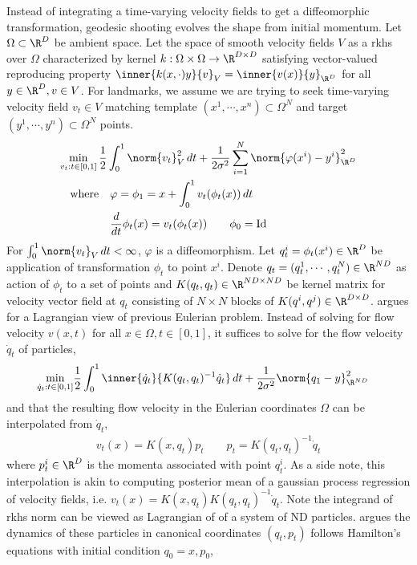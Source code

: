 \documentclass[11pt]{article}
\begin{document}
Instead of integrating a time-varying velocity fields to get a diffeomorphic transformation, geodesic shooting evolves the shape from initial momentum. Let $\Omega \subset\R^D$ be ambient space. Let the space of smooth velocity fields $V$ as a rkhs over $\Omega$ characterized by kernel $k:\Omega\times\Omega\to\R^{D\times D}$ satisfying vector-valued reproducing property $\inner{k(x,\cdot)y}{v}_{V} = \inner{v(x)}{y}_{\R^D}$ for all $y\in\R^D, v\in V$. For landmarks, we assume we are trying to seek time-varying velocity field $v_t\in V$ matching template $(x^1,\cdots,x^n)\subset \Omega^N$ and target $(y^1,\cdots,y^n)\subset\Omega^N$ points.
\begin{align}
    \min_{v_t:t\in [0,1]} \,
        &\frac{1}{2} \int_0^1 \norm{v_t}_V^2 \, dt + \frac{1}{2\sigma^2} \sum_{i=1}^N \norm{\varphi(x^i) - y^i}_{\R^{D}}^2 \\
        \text{where}
            &\quad \varphi = \phi_1 = x + \int_0^1 v_t(\phi_t(x)) \, dt \\
            &\quad \frac{d}{dt}\phi_t(x) = v_t(\phi_t(x)) \quad\quad \phi_0 = \text{Id}
\end{align}
For $\int_0^1 \norm{v_t}_V \, dt < \infty$, $\varphi$ is a diffeomorphism. Let $q_t^i = \phi_t(x^i) \in \R^D$ be application of transformation $\phi_t$ to point $x^i$. Denote $q_t = (q_t^1, \cdots, q_t^N) \in \R^{ND}$ as action of $\phi_t$ to a set of points and $K(q_t,q_t) \in \R^{ND\times ND}$ be kernel matrix for velocity vector field at $q_t$ consisting of $N\times N$ blocks of $K(q^i,q^j) \in \R^{D\times D}$. \cite{joshiLandmarkMatchingLarge2000} argues for a Lagrangian view of previous Eulerian problem. Instead of solving for flow velocity $v(x,t)$ for all $x\in\Omega, t\in [0,1]$, it suffices to solve for the flow velocity $\dot{q}_t$ of particles,
\begin{align}
    \min_{\dot{q}_t:t\in [0,1]}
        &\frac{1}{2} \int_0^1 \inner{\dot{q}_t}{K(q_t,q_t)^{-1}\dot{q}_t} \, dt + \frac{1}{2\sigma^2} \norm{q_1 - y}_{\R^{ND}}^2
\end{align}
and that the resulting flow velocity in the Eulerian coordinates $\Omega$ can be interpolated from $\dot{q}_t$,
\begin{align}
    v_t(x)
        = K(x, q_t) p_t
    \quad\quad
    p_t
        = K(q_t, q_t)^{-1} \dot{q}_t
\end{align}
where $p_t^i \in \R^{D}$ is the momenta associated with point $q_t^i$. As a side note, this interpolation is akin to computing posterior mean of a gaussian process regression of velocity fields, i.e. $v_t(x) = K(x,q_t) K(q_t,q_t)^{-1} \dot{q}_t$. Note the integrand of rkhs norm can be viewed as Lagrangian of of a system of ND particles. \cite{millerGeodesicShootingComputational2006} argues the dynamics of these particles in canonical coordinates $(q_t,p_t)$ follows Hamilton's equations with initial condition $q_0 = x, p_0$,
\end{document}
